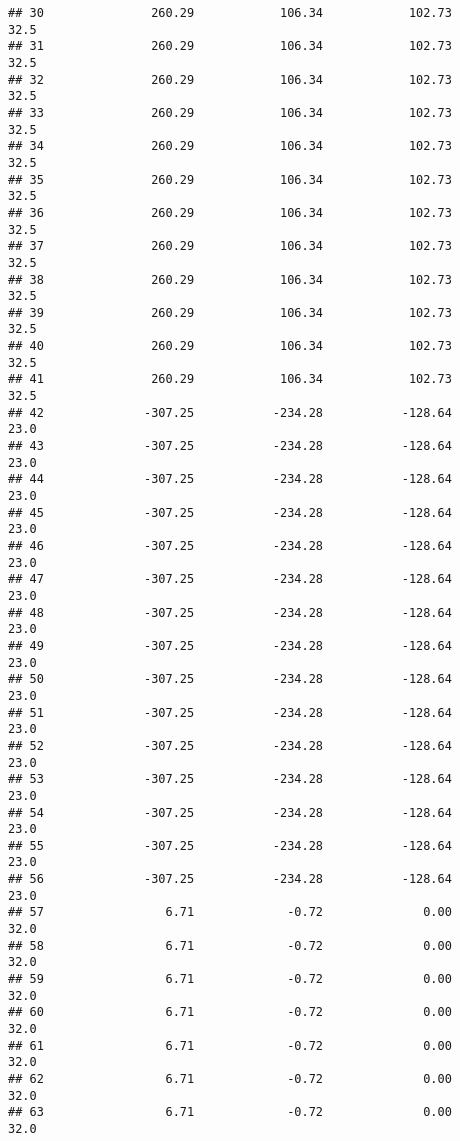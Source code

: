 \documentclass[]{article}
\begin{document}
\begin{verbatim}
## 30               260.29            106.34            102.73           32.5
## 31               260.29            106.34            102.73           32.5
## 32               260.29            106.34            102.73           32.5
## 33               260.29            106.34            102.73           32.5
## 34               260.29            106.34            102.73           32.5
## 35               260.29            106.34            102.73           32.5
## 36               260.29            106.34            102.73           32.5
## 37               260.29            106.34            102.73           32.5
## 38               260.29            106.34            102.73           32.5
## 39               260.29            106.34            102.73           32.5
## 40               260.29            106.34            102.73           32.5
## 41               260.29            106.34            102.73           32.5
## 42              -307.25           -234.28           -128.64           23.0
## 43              -307.25           -234.28           -128.64           23.0
## 44              -307.25           -234.28           -128.64           23.0
## 45              -307.25           -234.28           -128.64           23.0
## 46              -307.25           -234.28           -128.64           23.0
## 47              -307.25           -234.28           -128.64           23.0
## 48              -307.25           -234.28           -128.64           23.0
## 49              -307.25           -234.28           -128.64           23.0
## 50              -307.25           -234.28           -128.64           23.0
## 51              -307.25           -234.28           -128.64           23.0
## 52              -307.25           -234.28           -128.64           23.0
## 53              -307.25           -234.28           -128.64           23.0
## 54              -307.25           -234.28           -128.64           23.0
## 55              -307.25           -234.28           -128.64           23.0
## 56              -307.25           -234.28           -128.64           23.0
## 57                 6.71             -0.72              0.00           32.0
## 58                 6.71             -0.72              0.00           32.0
## 59                 6.71             -0.72              0.00           32.0
## 60                 6.71             -0.72              0.00           32.0
## 61                 6.71             -0.72              0.00           32.0
## 62                 6.71             -0.72              0.00           32.0
## 63                 6.71             -0.72              0.00           32.0

\end{verbatim}
\end{document}

